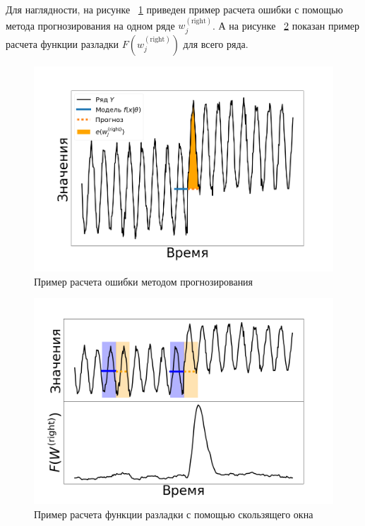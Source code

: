 \documentclass[%
12pt,
master,  %
natbib,      %
subf,        %
substylefile = spbu.rtx,
href,        %
colorlinks,  %
]{disser}
\begin{document}
Для наглядности, на рисунке ~\ref{fig:predicition_example_1} приведен пример расчета ошибки с помощью метода прогнозирования на одном ряде  $ w_j^{\mathrm{(right)}} $. А на рисунке ~\ref{fig:predicition_example_2} показан пример расчета функции разладки $ F(w_j^{\mathrm{(right)}}) $ для всего ряда.

\begin{figure}[!hhh]
	\begin{center}
		\includegraphics[width=12cm]{approaches_first_4_ru}
	\end{center}
	\vspace{-5mm}\caption{Пример расчета ошибки методом прогнозирования}
	\label{fig:predicition_example_1}
\end{figure}

\begin{figure}[!hhh]
	\begin{center}
		\includegraphics[width=12cm]{approaches_first_6_ru}
	\end{center}
	\vspace{-5mm}\caption{Пример расчета функции разладки с помощью скользящего окна}
	\label{fig:predicition_example_2}
\end{figure}
\end{document}
